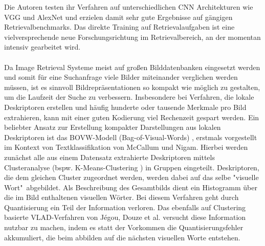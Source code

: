 Die Autoren testen ihr Verfahren auf unterschiedlichen CNN Architekturen wie VGG \cite{vgg} und AlexNet \cite{alexnet} und erzielen damit sehr gute Ergebnisse auf gängigen Retrievalbenchmarks. Das direkte Training auf Retrievalaufgaben ist eine vielversprechende neue Forschungsrichtung im Retrievalbereich, an der momentan intensiv gearbeitet wird.
\\\\
Da Image Retrieval Systeme meist auf großen Bilddatenbanken eingesetzt werden und somit für eine Suchanfrage viele Bilder miteinander verglichen werden müssen, ist es sinnvoll Bildrepräsentationen so kompakt wie möglich zu gestalten, um die Laufzeit der Suche zu verbessern. Insbesondere bei Verfahren, die lokale Deskriptoren erstellen und häufig hunderte oder tausende Merkmale pro Bild extrahieren, kann mit einer guten Kodierung viel Rechenzeit gespart werden. Ein beliebter Ansatz zur Erstellung kompakter Darstellungen aus lokalen Deskriptoren ist das BOVW-Modell (Bag-of-Visual-Words) \cite{bow}, erstmals vorgestellt im Kontext von Textklassifikation von McCallum und Nigam. Hierbei werden zunächst alle aus einem Datensatz extrahierte Deskriptoren mittels Clusteranalyse (bspw. K-Means-Clustering \cite{k_means}) in Gruppen eingeteilt. Deskriptoren, die dem gleichen Cluster zugeordnet werden, werden dabei auf das selbe "visuelle Wort"\ abgebildet. Als Beschreibung des Gesamtbilds dient ein Histogramm über die im Bild enthaltenen visuellen Wörter. Bei diesem Verfahren geht durch Quantisierung ein Teil der Information verloren. Das ebenfalls auf Clustering basierte VLAD-Verfahren \cite{vlad} von Jégou, Douze et al. versucht diese Information nutzbar zu machen, indem es statt der Vorkommen die Quantisierungsfehler akkumuliert, die beim abbilden auf die nächsten visuellen Worte entstehen. \\
